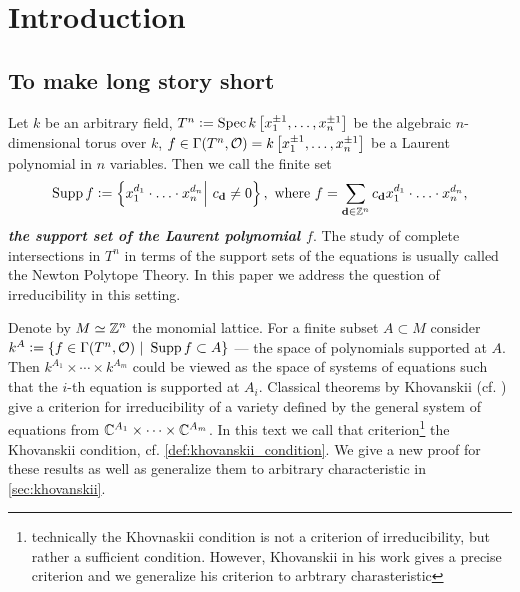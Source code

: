 \section{Introduction}
\subsection{To make long story short}
Let $k$ be an arbitrary field, $T^n \vcentcolon= \operatorname{Spec} k\left[ x_1^{\pm1}, \dots, x_n^{\pm 1} \right]$ be the algebraic $n$-dimensional torus over $k$, $f \in \Gamma(T^n, \mathcal{O}) =  k\left[ x_1^{\pm1}, \dots, x_n^{\pm 1} \right] $ be a Laurent polynomial in $n$ variables. Then we call the finite set
\[
\operatorname{Supp} f \vcentcolon= \left\{ x_1^{d_1} \cdot \hdots \cdot x_n^{d_n} \middle|\ c_{\mathbf d} \ne 0 \right\}, \text{ where } f = \sum_{\mathbf d \in \mathbb Z^n} c_{\mathbf d} x_1^{d_1} \cdot \hdots \cdot x_n^{d_n},
\]
{\itshape \bfseries the support set of the Laurent polynomial $f$}. The study of complete intersections in $T^n$ in terms of the support sets of the equations is usually called the Newton Polytope Theory. In this paper we address the question of irreducibility in this setting.

Denote by $M \simeq \mathbb Z^n$ the monomial lattice. For a finite subset $A \subset M$ consider $k^A \vcentcolon= \left\{ f \in \Gamma(T^n, \mathcal{O})\ |\ \operatorname{Supp} f \subset A \right\}$ --- the space of polynomials supported at $A$. Then $k^{A_1} \times \cdots \times k^{A_m}$ could be viewed as the space of systems of equations such that the $i$-th equation is supported at $A_i$. Classical theorems by Khovanskii (cf. \cite{Khovanskii2016}) give a criterion for irreducibility of a variety defined by the general system of equations from $\mathbb C^{A_1} \times \dots \times \mathbb C^{A_m}$. In this text we call that criterion\footnote{technically the Khovnaskii condition is not a criterion of irreducibility, but rather a sufficient condition. However, Khovanskii in his work gives a precise criterion and we generalize his criterion to arbtrary charasteristic} the Khovanskii condition, cf. \autoref{def:khovanskii_condition}. We give a new proof for these results as well as generalize them to arbitrary characteristic in \autoref{sec:khovanskii}. 

